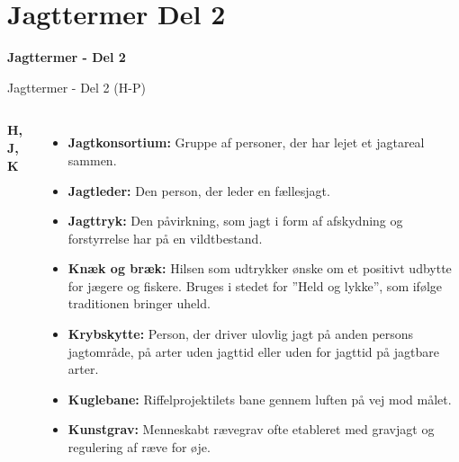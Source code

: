 \section{Jagttermer Del 2}

\begin{frame}
  \vspace{3em}
  \begin{center}
    {\LARGE \textbf{Jagttermer - Del 2}
    }
    \\
    \vspace{1em}
  \end{center}
\end{frame}


\begin{frame}{Jagttermer - Del 2 (H-P)}

\vspace{0.3em} %

\begin{columns}[T]
    \textbf{\large H, J, K}
    \setlength{\parskip}{0.1em} %
    \scriptsize %
    \RaggedRight
    \begin{itemize}
        \item \textbf{Jagtkonsortium:} Gruppe af personer, der har lejet et jagtareal sammen.
        \item \textbf{Jagtleder:} Den person, der leder en fællesjagt.
        \item \textbf{Jagttryk:} Den påvirkning, som jagt i form af afskydning og forstyrrelse har på en vildtbestand.
        \item \textbf{Knæk og bræk:} Hilsen som udtrykker ønske om et positivt udbytte for jægere og fiskere. Bruges i stedet for ”Held og lykke”, som ifølge traditionen bringer uheld.
        \item \textbf{Krybskytte:} Person, der driver ulovlig jagt på anden persons jagtområde, på arter uden jagttid eller uden for jagttid på jagtbare arter.
        \item \textbf{Kuglebane:} Riffelprojektilets bane gennem luften på vej mod målet.
        \item \textbf{Kunstgrav:} Menneskabt rævegrav ofte etableret med gravjagt og regulering af ræve for øje.
    \end{itemize}


\end{columns}
\end{frame}
